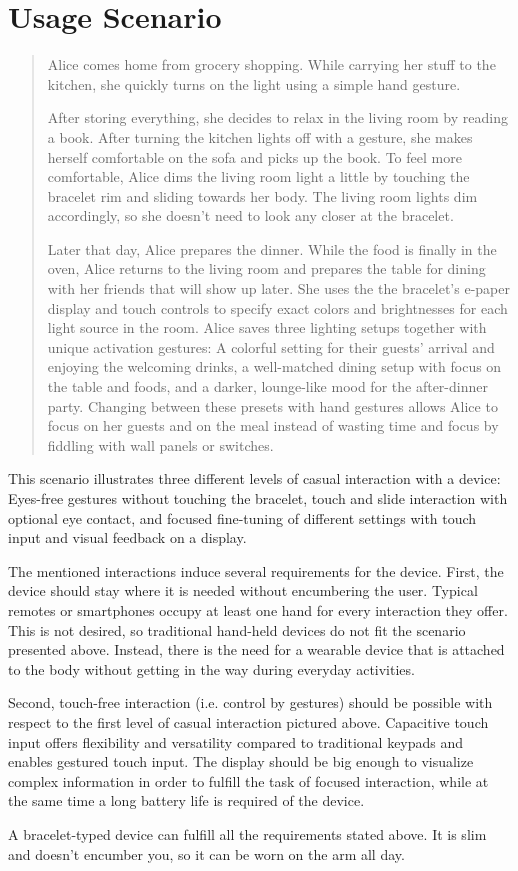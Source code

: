 \chapter{Usage Scenario}

\begin{quotation}
Alice comes home from grocery shopping. While carrying her stuff to the kitchen, she quickly turns on the light using a simple hand gesture.

After storing everything, she decides to relax in the living room by reading a book. After turning the kitchen lights off with a gesture, she makes herself comfortable on the sofa and picks up the book. To feel more comfortable, Alice dims the living room light a little by touching the bracelet rim and sliding towards her body. The living room lights dim accordingly, so she doesn't need to look any closer at the bracelet.

Later that day, Alice prepares the dinner. While the food is finally in the oven, Alice returns to the living room and prepares the table for dining with her friends that will show up later. She uses the the bracelet's e-paper display and touch controls to specify exact colors and brightnesses for each light source in the room. Alice saves three lighting setups together with unique activation gestures: A colorful setting for their guests' arrival and enjoying the welcoming drinks, a well-matched dining setup with focus on the table and foods, and a darker, lounge-like mood for the after-dinner party. Changing between these presets with hand gestures allows Alice to focus on her guests and on the meal instead of wasting time and focus by fiddling with wall panels or switches.
\end{quotation}

This scenario illustrates three different levels of casual interaction with a device: Eyes-free gestures without touching the bracelet, touch and slide interaction with optional eye contact, and focused fine-tuning of different settings with touch input and visual feedback on a display.

The mentioned interactions induce several requirements for the device. First, the device should stay where it is needed without encumbering the user. Typical remotes or smartphones occupy at least one hand for every interaction they offer. This is not desired, so traditional hand-held devices do not fit the scenario presented above. Instead, there is the need for a wearable device that is attached to the body without getting in the way during everyday activities.

Second, touch-free interaction (i.e. control by gestures) should be possible with respect to the first level of casual interaction pictured above. Capacitive touch input offers flexibility and versatility compared to traditional keypads and enables gestured touch input. The display should be big enough to visualize complex information in order to fulfill the task of focused interaction, while at the same time a long battery life is required of the device.

A bracelet-typed device can fulfill all the requirements stated above. It is slim and doesn't encumber you, so it can be worn on the arm all day.